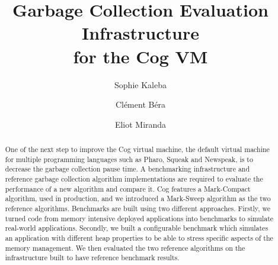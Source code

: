 \documentclass[10pt, sigplan]{acmart}
\begin{document}
\title[Garbage Collection Evaluation Infrastructure]{Garbage Collection Evaluation Infrastructure\\ for the Cog VM}

\author{Sophie Kaleba}

\author{Cl\'ement B\'era}

\author{Eliot Miranda}

\begin{abstract}
One of the next step to improve the Cog virtual machine, the default virtual machine for multiple programming languages such as Pharo, Squeak and Newspeak, is to decrease the garbage collection pause time. A benchmarking infrastructure and reference garbage collection algorithm implementations are required to evaluate the performance of a new algorithm and compare it. Cog features a Mark-Compact algorithm, used in production, and we introduced a Mark-Sweep algorithm as the two reference algorithms. Benchmarks are built using two different approaches. Firstly, we turned code from memory intensive deployed applications into benchmarks to simulate real-world applications. Secondly, we built a configurable benchmark which simulates an application with different heap properties to be able to stress specific aspects of the memory management. We then evaluated the two reference algorithms on the infrastructure built to have reference benchmark results.
\end{abstract}
\end{document}

